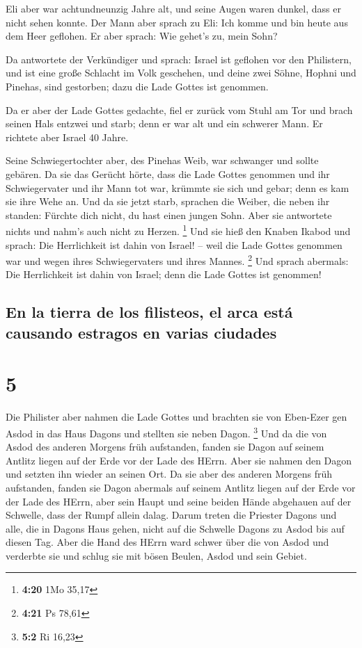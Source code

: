  Eli aber war achtundneunzig Jahre alt, und seine Augen
waren dunkel, dass er nicht sehen konnte.  Der Mann aber
sprach zu Eli: Ich komme und bin heute aus dem Heer geflohen. Er aber
sprach: Wie gehet's zu, mein Sohn?

 Da antwortete der Verkündiger und sprach: Israel ist
geflohen vor den Philistern, und ist eine große Schlacht im Volk
geschehen, und deine zwei Söhne, Hophni und Pinehas, sind gestorben;
dazu die Lade Gottes ist genommen.

 Da er aber der Lade Gottes gedachte, fiel er zurück vom
Stuhl am Tor und brach seinen Hals entzwei und starb; denn er war alt
und ein schwerer Mann. Er richtete aber Israel 40 Jahre.

 Seine Schwiegertochter aber, des Pinehas Weib, war
schwanger und sollte gebären. Da sie das Gerücht hörte, dass die Lade
Gottes genommen und ihr Schwiegervater und ihr Mann tot war, krümmte sie
sich und gebar; denn es kam sie ihre Wehe an.  Und da sie
jetzt starb, sprachen die Weiber, die neben ihr standen: Fürchte dich
nicht, du hast einen jungen Sohn. Aber sie antwortete nichts und nahm's
auch nicht zu Herzen. \footnote{\textbf{4:20} 1Mo 35,17} 
Und sie hieß den Knaben Ikabod und sprach: Die Herrlichkeit ist dahin
von Israel! -- weil die Lade Gottes genommen war und wegen ihres
Schwiegervaters und ihres Mannes. \footnote{\textbf{4:21} Ps 78,61}
 Und sprach abermals: Die Herrlichkeit ist dahin von
Israel; denn die Lade Gottes ist genommen!

\hypertarget{en-la-tierra-de-los-filisteos-el-arca-estuxe1-causando-estragos-en-varias-ciudades}{%
\subsection{En la tierra de los filisteos, el arca está causando
estragos en varias
ciudades}\label{en-la-tierra-de-los-filisteos-el-arca-estuxe1-causando-estragos-en-varias-ciudades}}

\hypertarget{section-4}{%
\section{5}\label{section-4}}

 Die Philister aber nahmen die Lade Gottes und brachten
sie von Eben-Ezer gen Asdod  in das Haus Dagons und
stellten sie neben Dagon. \footnote{\textbf{5:2} Ri 16,23}
 Und da die von Asdod des anderen Morgens früh aufstanden,
fanden sie Dagon auf seinem Antlitz liegen auf der Erde vor der Lade des
HErrn. Aber sie nahmen den Dagon und setzten ihn wieder an seinen Ort.
 Da sie aber des anderen Morgens früh aufstanden, fanden
sie Dagon abermals auf seinem Antlitz liegen auf der Erde vor der Lade
des HErrn, aber sein Haupt und seine beiden Hände abgehauen auf der
Schwelle, dass der Rumpf allein dalag.  Darum treten die
Priester Dagons und alle, die in Dagons Haus gehen, nicht auf die
Schwelle Dagons zu Asdod bis auf diesen Tag.  Aber die
Hand des HErrn ward schwer über die von Asdod und verderbte sie und
schlug sie mit bösen Beulen, Asdod und sein Gebiet.

